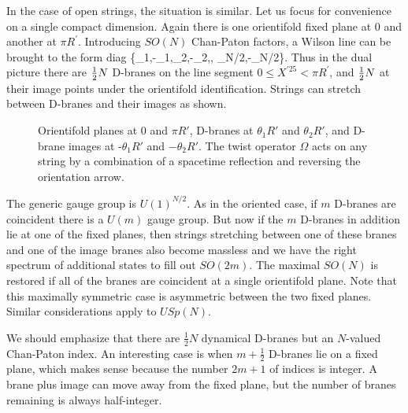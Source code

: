 In the case of open strings, the situation is similar.
Let us focus for convenience on a single compact dimension.  Again
there is one orientifold fixed plane at $0$ and another at $\pi R^\prime$.  
Introducing $SO(N)$ Chan-Paton factors, a Wilson line can be brought to
the form 
\be
{\rm diag}
\{\theta_1,-\theta_1,\theta_2,-\theta_2,\cdots,
\theta_{N/2},-\theta_{N/2}\}.
\ee
Thus in the dual picture there are 
${1\over 2}N$ D-branes on the line segment $0\leq X^{\prime25}<\pi
R^\prime$, and ${1\over 2}N$ at their image points under the orientifold
identification. %
Strings can stretch between D-branes and their images as shown.
\begin{figure}
\begin{center}
\leavevmode
{}
\end{center}
\caption[]{Orientifold planes at $0$ and $\pi R'$, D-branes at
$\theta_1 R'$ and $\theta_2 R'$, and D-brane images at -$\theta_1 R'$ and
$-\theta_2 R'$.  The twist operator $\Omega$ acts on any string by a
combination of a spacetime reflection and reversing the orientation
arrow.}
\end{figure}
The generic gauge group is $U(1)^{N/2}$.  As in the oriented case,
if $m$ D-branes are coincident there is a $U(m)$ gauge group.
But now if the $m$ D-branes in addition lie at one of the fixed planes,
then strings stretching between one of these branes and one of the image
branes also become massless and we have the right spectrum of additional
states to fill out $SO(2m)$. The maximal $SO(N)$ is restored if all of
the branes are coincident at a
single orientifold plane.  Note that this maximally symmetric case is
asymmetric between the two fixed planes.
Similar considerations apply
to $USp(N)$.  

We should emphasize that there are $\frac{1}{2}N$
dynamical D-branes but an $N$-valued Chan-Paton index.  An interesting
case is when $m + \frac{1}{2}$ D-branes lie on a fixed plane, which makes
sense because the number $2m + 1$ of indices is integer.  A brane plus
image can move away from the fixed plane, but the number of branes remaining
is always half-integer.

